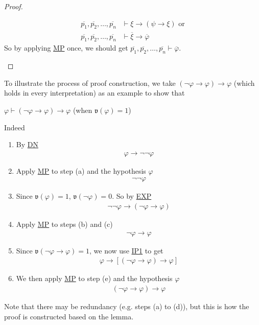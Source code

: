 \documentclass{treatise}
\begin{document}
\begin{proof}
\begin{enumerate}
\begin{enumerate}
        \begin{align*}
            \overline{p_1}, \overline{p_2}, \hdots, \overline{p_n} & \vdash \xi \to (\psi \to \xi) \mbox{ or}
            \\
            \overline{p_1}, \overline{p_2}, \hdots, \overline{p_n} & \vdash \overline{\xi} \to \overline{\varphi}
        \end{align*}
        So by applying \hyperref[HPL-R-MP]{MP} once, we should get $\overline{p_1}, \overline{p_2}, \hdots, \overline{p_n} \vdash \overline{\varphi}$.
    \end{enumerate}
\end{enumerate}
\end{proof}
\begin{remark}
To illustrate the process of proof construction, we take $(\neg \varphi \to \varphi) \to \varphi$ (which holds in every interpretation) as an example to show that
\begin{center}
    $\varphi \vdash (\neg \varphi \to \varphi) \to \varphi$ (when $\mathfrak{v}(\varphi) = 1$)
\end{center}
Indeed
\begin{enumerate}[label = (\alph*)]
    \item By \hyperref[HPL-T-DN]{DN}
    \begin{align*}
        \varphi \to \neg \neg \varphi
    \end{align*}
    \item Apply \hyperref[HPL-R-MP]{MP} to step (a) and the hypothesis $\varphi$
    \begin{align*}
        \neg \neg \varphi
    \end{align*}
    \item Since $\mathfrak{v}(\varphi) = 1$, $\mathfrak{v}(\neg\varphi) = 0$. So by \hyperref[HPL-T-EXP]{EXP}
    \begin{align*}
        \neg \neg \varphi \to (\neg \varphi \to \varphi)
    \end{align*}
    \item Apply \hyperref[HPL-R-MP]{MP} to steps (b) and (c)
    \begin{align*}
        \neg \varphi \to \varphi
    \end{align*}
    \item Since $\mathfrak{v}(\neg \varphi \to \varphi) = 1$, we now use \hyperref[HPL-A-IP1]{IP1} to get
    \begin{align*}
        \varphi \to [(\neg \varphi \to \varphi) \to \varphi]
    \end{align*}
    \item We then apply \hyperref[HPL-R-MP]{MP} to step (e) and the hypothesis $\varphi$
    \begin{align*}
        (\neg \varphi \to \varphi) \to \varphi
    \end{align*}
\end{enumerate}
Note that there may be redundancy (e.g. steps (a) to (d)), but this is how the proof is constructed based on the lemma.
\end{remark}
\end{document}
